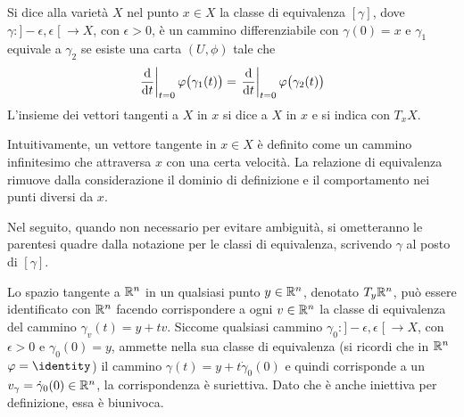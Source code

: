 \begin{definition}
  Si dice  alla varietà $X$ nel punto $x \in  X$ la classe di equivalenza $[\gamma]$, dove $\gamma:]-\epsilon,\epsilon\;[\ \to X$, con $\epsilon > 0$, è un cammino differenziabile con $\gamma(0) = x$ e $\gamma_1$ equivale a $\gamma_2$ se esiste una carta $(U, \phi)$ tale che \begin{equation*}
  \eval{\dv{t}}_{t=0} \phi \big(\gamma_1(t)\big) = \eval{\dv{t}}_{t=0} \phi\big(\gamma_2(t)\big)
  \end{equation*} 
  L'insieme dei vettori tangenti a $X$ in $x$ si dice  a $X$ in $x$ e si indica con $T_x X$.
\end{definition}
\begin{remark}
  Intuitivamente, un vettore tangente in $x \in X$ è definito come un cammino infinitesimo che attraversa $x$ con una certa velocità. La relazione di equivalenza rimuove dalla considerazione il dominio di definizione e il comportamento nei punti diversi da $x$.
\end{remark}
Nel seguito, quando non necessario per evitare ambiguità, si ometteranno le parentesi quadre dalla notazione per le classi di equivalenza, scrivendo $\gamma$ al posto di $[\gamma]$.

Lo spazio tangente a $\mathbb{R}^{n}$ in un qualsiasi punto $y \in \mathbb{R}^{n}$, denotato $T_y \mathbb{R}^{n}$, può essere identificato con $\mathbb{R}^{n}$ facendo corrispondere a ogni $v \in \mathbb{R}^{n}$ la classe di equivalenza del cammino $\gamma_v(t) = y + tv$. Siccome qualsiasi cammino $\gamma_0:]-\epsilon,\epsilon\;[\ \to X$, con $\epsilon > 0$ e $\gamma_0(0)=y$, ammette nella sua classe di equivalenza (si ricordi che in $\mathbb{R}^{n}$ $\phi = \identity$) il cammino $\gamma(t) = y + t\dot{\gamma}_0(0)$ e quindi corrisponde a un $v_{\gamma} = \dot{\gamma}_0(0) \in \mathbb{R}^{n}$, la corrispondenza è suriettiva. Dato che è anche iniettiva per definizione, essa è biunivoca. 

